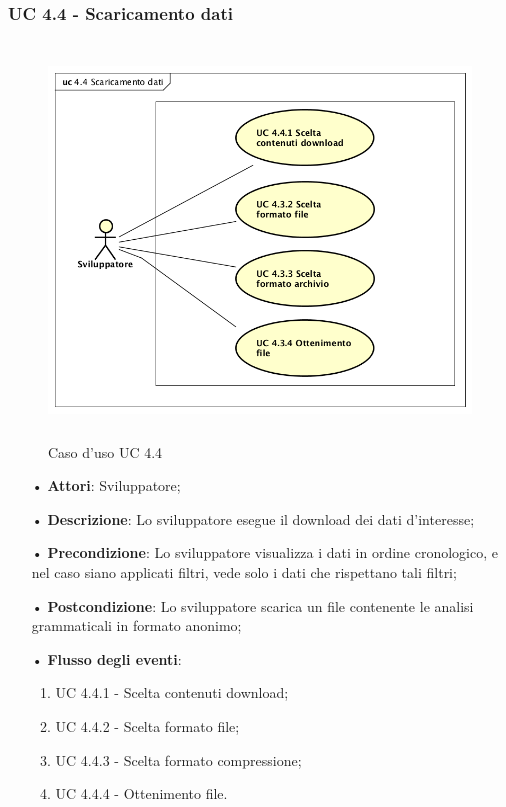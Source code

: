 \subsubsection{UC 4.4 - Scaricamento dati}
\begin{figure}[H]
\centering
\includegraphics[width=17cm, height=10.5cm]{img/UC440.png} 
\caption{Caso d'uso UC 4.4}\label{fig:440}
\end{figure}
\begin{itemize}
\item[•]\textbf{Attori}: Sviluppatore;
\item[•]\textbf{Descrizione}: Lo sviluppatore esegue il download dei dati d'interesse;
\item[•]\textbf{Precondizione}: Lo sviluppatore visualizza i dati in ordine cronologico, e nel caso siano applicati filtri, vede solo i dati che rispettano tali filtri;
\item[•]\textbf{Postcondizione}:  Lo sviluppatore scarica un file contenente le analisi grammaticali in formato anonimo;
\item[•]\textbf{Flusso degli eventi}:
\begin{enumerate}
\item UC 4.4.1 - Scelta contenuti download;
\item UC 4.4.2 - Scelta formato file;
\item UC 4.4.3 - Scelta formato compressione;
\item UC 4.4.4 - Ottenimento file.
\end{enumerate}
\end{itemize}

